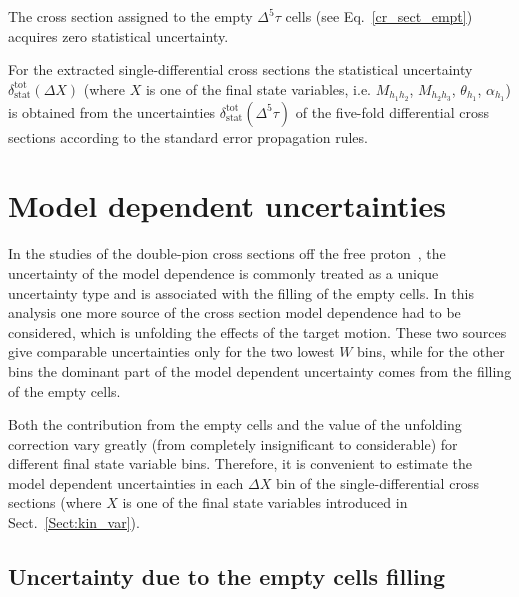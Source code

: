 The cross section assigned to the empty $\Delta^{5} \tau$ cells (see Eq.~\eqref{cr_sect_empt}) acquires zero statistical uncertainty.

For the extracted  single-differential cross sections the statistical uncertainty $\delta_{\text{stat}}^{\text{tot}}(\Delta X)$ (where $X$ is one of the final state variables, i.e. $M_{h_{1}h_{2}}$, $M_{h_{2}h_{3}}$, $\theta_{h_1}$, $\alpha_{h_1}$) is obtained from the uncertainties  $\delta_{\text{stat}}^{\text{tot}}(\Delta^{5} \tau)$ of the five-fold differential cross sections according to the standard error propagation rules.




\section{Model dependent uncertainties}
\label{Sect:mod_dep}
In the studies of the double-pion cross sections off the free proton~\cite{Rip_an_note:2002,Ripani:2002ss,Fed_an_note:2007,Fedotov:2008aa,Isupov:2017lnd,Arjun,Fed_an_note:2017,Fed_paper_2018}, the uncertainty of the model dependence is commonly treated as a unique uncertainty type and is associated with the filling of the empty cells. In this analysis one more source of the cross section model dependence had to be considered, which is unfolding the effects of the target motion. These two sources give comparable uncertainties only for the two lowest $W$ bins, while for the other bins the dominant part of the model dependent uncertainty comes from the filling of the empty cells.

Both the contribution from the empty cells and the value of the unfolding correction vary greatly (from completely insignificant to considerable) for different final state variable bins. Therefore, it is convenient to estimate the model dependent uncertainties in each $\Delta X$ bin of the single-differential cross sections (where $X$ is one of the final state variables introduced in Sect.~\ref{Sect:kin_var}).


\subsection{Uncertainty due to the empty cells filling}


